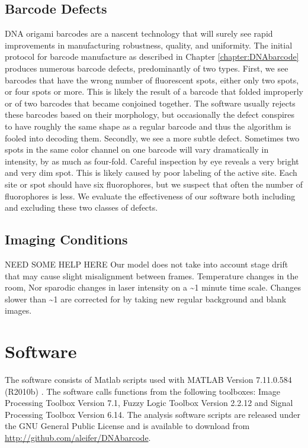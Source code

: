\subsection{Barcode Defects}\label{sec:defects}
DNA origami barcodes are a nascent technology that will surely see rapid improvements in manufacturing robustness, quality, and uniformity. The initial protocol for barcode manufacture as described in Chapter \ref{chapter:DNAbarcode} produces numerous barcode defects, predominantly of two types. First, we see barcodes that have the wrong number of fluorescent spots, either only two spots, or four spots or more. This is likely the result of a barcode that folded improperly or of two barcodes that became conjoined together. The software usually rejects these barcodes based on their morphology, but occasionally the defect conspires to have roughly the same shape as a regular barcode and thus the algorithm is fooled into decoding them. Secondly, we see a more subtle defect. Sometimes two spots in the same color channel on one barcode will vary dramatically in intensity, by as much as four-fold. Careful inspection by eye reveals a very bright and very dim spot. This is likely caused by poor labeling of the active site. Each site or spot should have six fluorophores, but we suspect that often the number of fluorophores is less. We evaluate the effectiveness of our software both including and excluding these two classes of defects.    


\subsection{Imaging Conditions}
NEED SOME HELP HERE
Our model does not take into account stage drift that may cause slight misalignment between frames. 
Temperature changes in the room, Nor sparodic changes in laser intensity on a \textasciitilde1 minute time scale. Changes slower than \textasciitilde1 are corrected for by taking new regular background and blank images.
 
\section{Software}
The software consists of Matlab scripts used with MATLAB Version 7.11.0.584 (R2010b) \citep{matlab_version_2010}. The software calls functions from the following toolboxes: Image Processing Toolbox Version 7.1, Fuzzy Logic Toolbox Version 2.2.12 and Signal Processing Toolbox Version 6.14. The analysis software scripts are released under the GNU General Public License and is available to download from \url{http://github.com/aleifer/DNAbarcode}.

